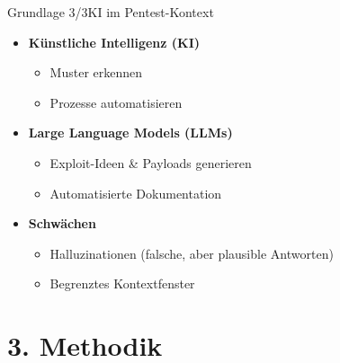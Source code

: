 \documentclass[
	aspectratio=169,	%
	onlytextwidth,		%
	t,					%
	]{beamer}
\begin{document}
\begin{frame}{Grundlage 3/3}{KI im Pentest-Kontext}
	\begin{itemize}
		\item \textbf{Künstliche Intelligenz (KI)}
		\begin{itemize}
			\item Muster erkennen 
			\item Prozesse automatisieren
		\end{itemize}
		
		\vspace{2mm}
		\item \textbf{Large Language Models (LLMs)}
		\begin{itemize}
			\item Exploit-Ideen \& Payloads generieren
			\item Automatisierte Dokumentation
		\end{itemize}
		
		\vspace{2mm}
		\item \textbf{Schwächen}
		\begin{itemize}
			\item Halluzinationen (falsche, aber plausible Antworten)
			\item Begrenztes Kontextfenster
		\end{itemize}
	\end{itemize}
\end{frame}


\section{3. Methodik}
\end{document}
